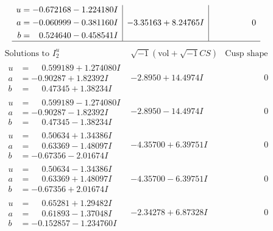 \documentclass[1p]{elsarticle_modified}
\theoremstyle{definition}
\newcommand{\I}{\sqrt{-1}}
\begin{document}
$$\begin{array}{c|c|c}
\begin{aligned}
u &= -0.672168 - 1.224180 I \\
a &= -0.060999 - 0.381160 I \\
b &= \phantom{-}0.524640 - 0.458541 I\end{aligned}
 & -3.35163 + 8.24765 I & \phantom{-0.000000 } 0\\
 \hline 
 \end{array}$$\newpage$$\begin{array}{c|c|c}  
\text{Solutions to }I^u_{2}& \I (\text{vol} + \sqrt{-1}CS) & \text{Cusp shape}\\
 \hline 
\begin{aligned}
u &= \phantom{-}0.599189 + 1.274080 I \\
a &= -0.90287 + 1.82392 I \\
b &= \phantom{-}0.47345 + 1.38234 I\end{aligned}
 & -2.8950 + 14.4974 I & \phantom{-0.000000 } 0 \\ \hline\begin{aligned}
u &= \phantom{-}0.599189 - 1.274080 I \\
a &= -0.90287 - 1.82392 I \\
b &= \phantom{-}0.47345 - 1.38234 I\end{aligned}
 & -2.8950 - 14.4974 I & \phantom{-0.000000 } 0 \\ \hline\begin{aligned}
u &= \phantom{-}0.50634 + 1.34386 I \\
a &= \phantom{-}0.63369 - 1.48097 I \\
b &= -0.67356 - 2.01674 I\end{aligned}
 & -4.35700 + 6.39751 I & \phantom{-0.000000 } 0 \\ \hline\begin{aligned}
u &= \phantom{-}0.50634 - 1.34386 I \\
a &= \phantom{-}0.63369 + 1.48097 I \\
b &= -0.67356 + 2.01674 I\end{aligned}
 & -4.35700 - 6.39751 I & \phantom{-0.000000 } 0 \\ \hline\begin{aligned}
u &= \phantom{-}0.65281 + 1.29482 I \\
a &= \phantom{-}0.61893 - 1.37048 I \\
b &= -0.152857 - 1.234760 I\end{aligned}
 & -2.34278 + 6.87328 I & \phantom{-0.000000 } 0 \\ \hline\begin{aligned}

\end{aligned}
\end{array}$$
\end{document}
